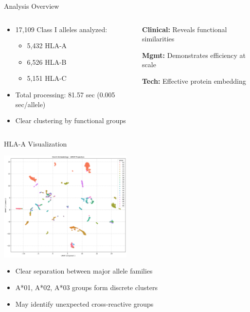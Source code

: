 \documentclass[aspectratio=169]{beamer}
\newcommand{\formanagement}[1]{\textcolor{managementcolor}{\textbf{Mgmt:} #1}}
\newcommand{\forclinical}[1]{\textcolor{clinicalcolor}{\textbf{Clinical:} #1}}
\newcommand{\forbioinformatics}[1]{\textcolor{bioinfocolor}{\textbf{Tech:} #1}}
\begin{document}
\begin{frame}{Analysis Overview}
  \begin{columns}
    \begin{column}{0.6\textwidth}
      \begin{itemize}
        \item 17,109 Class I alleles analyzed:
          \begin{itemize}\small
            \item 5,432 HLA-A
            \item 6,526 HLA-B
            \item 5,151 HLA-C
          \end{itemize}
        \item Total processing: 81.57 sec (0.005 sec/allele)
        \item Clear clustering by functional groups
      \end{itemize}
    \end{column}
    \begin{column}{0.4\textwidth}
      \begin{tcolorbox}[colback=gray!5,colframe=gray!40]
      \forclinical{Reveals functional similarities}
      
      \formanagement{Demonstrates efficiency at scale}
      
      \forbioinformatics{Effective protein embedding}
      \end{tcolorbox}
    \end{column}
  \end{columns}
\end{frame}

\begin{frame}{HLA-A Visualization}
  \begin{center}
    \includegraphics[width=0.5\textwidth]{data/analysis/locus_embeddings/class1/plots/hla_A_umap.png}
  \end{center}
  
  \begin{itemize}\small
    \item Clear separation between major allele families
    \item A*01, A*02, A*03 groups form discrete clusters
    \item May identify unexpected cross-reactive groups
  \end{itemize}
\end{frame}
\end{document}
